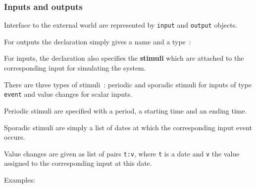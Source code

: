 \subsubsection*{Inputs and outputs}
\label{sec:inputs-outputs}

Interface to the external world are represented by \verb|input| and \verb|output| objects.

\step For outputs the declaration simply gives a name and a type~:

\begin{center}
\end{center}

\step For inputs, the declaration also specifies the \textbf{stimuli} which are attached to the
corresponding input for simulating the system.
\begin{center}
\end{center}

There are three types of stimuli~:
periodic and
sporadic stimuli for inputs of type \verb|event| and value changes for scalar inputs.

\medskip
Periodic stimuli are specified with a period, a starting time and an ending time.

\begin{center}
\end{center}

Sporadic stimuli
are simply a list of dates at which the corresponding input event occurs.

\begin{center}
\end{center}

Value changes are given as
list of pairs \verb|t:v|, where \verb|t| is a date and \verb|v| the value assigned to the
corresponding input at this date. 

\begin{center}
\end{center}

\medskip
Examples:

\begin{center}
\end{center}

